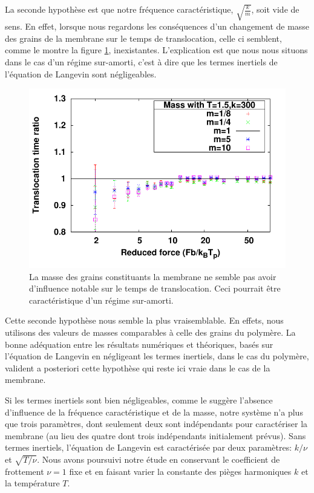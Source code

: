 La seconde hypothèse est que notre fréquence caractéristique, $\sqrt{\frac{k}{m}}$, soit vide de sens. En effet, lorsque nous regardons les conséquences d'un changement de masse des grains de la membrane sur le temps de translocation, celle ci semblent, comme le montre la figure \ref{influencemasse}, inexistantes. L'explication est que nous nous situons dans le cas d'un régime sur-amorti, c'est à dire que les termes inertiels de l'équation de Langevin sont négligeables.

\begin{figure}[H]
\begin{center}
\includegraphics[width=\textwidth]{compmt15.pdf} 

\caption[Influence de la masse]{La masse des grains constituants la membrane ne semble pas avoir d'influence notable sur le temps de translocation. Ceci pourrait être caractéristique d'un régime sur-amorti.}
\label{influencemasse}
\end{center}
\end{figure}

Cette seconde hypothèse nous semble la plus vraisemblable. En effets, nous utilisons des valeurs de masses comparables à celle des grains du polymère. La bonne adéquation entre les résultats numériques et théoriques, basés sur l'équation de Langevin en négligeant les termes inertiels, dans le cas du polymère, valident a posteriori cette hypothèse qui reste ici vraie dans le cas de la membrane.

Si les termes inertiels sont bien négligeables, comme le suggère l'absence d'influence de la fréquence caractéristique et de la masse, notre système n'a plus que trois paramètres, dont seulement deux sont indépendants pour caractériser la membrane (au lieu des quatre dont trois indépendants initialement prévus). Sans termes inertiels, l'équation de Langevin est caractérisée par deux paramètres: $k/\nu$ et $\sqrt{T / \nu}$. Nous avons poursuivi notre étude en conservant le coefficient de frottement $\nu=1$ fixe et en faisant varier la constante des pièges harmoniques $k$ et la température $T$.


